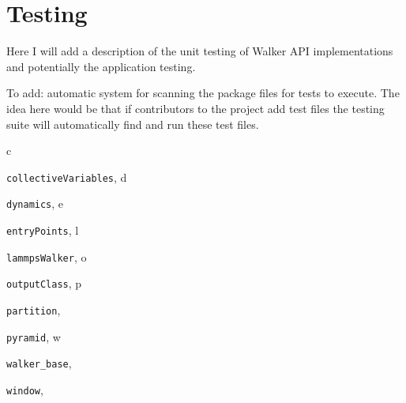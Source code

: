 \documentclass[letterpaper,10pt,english]{sphinxmanual}
\begin{document}
\chapter{Testing}
\label{test/testing.doc:testing}\label{test/testing.doc::doc}
Here I will add a description of the unit testing of Walker API implementations and potentially the application testing.

To add: automatic system for scanning the package files for tests to execute. The idea here would be that if contributors to the project add test files the testing suite will automatically find and run these test files.


\renewcommand{\indexname}{Python Module Index}
\begin{theindex}
\def\bigletter#1{{\Large\sffamily#1}\nopagebreak\vspace{1mm}}
\bigletter{c}
\item {\texttt{collectiveVariables}}, \pageref{walker_api/walker_api.doc:module-collectiveVariables}
\indexspace
\bigletter{d}
\item {\texttt{dynamics}}, \pageref{walker_api/walker_api.doc:module-dynamics}
\indexspace
\bigletter{e}
\item {\texttt{entryPoints}}, \pageref{applications/applications.doc:module-entryPoints}
\indexspace
\bigletter{l}
\item {\texttt{lammpsWalker}}, \pageref{walker_api/walker_api.doc:module-lammpsWalker}
\indexspace
\bigletter{o}
\item {\texttt{outputClass}}, \pageref{walker_api/walker_api.doc:module-outputClass}
\indexspace
\bigletter{p}
\item {\texttt{partition}}, \pageref{applications/applications.doc:module-partition}
\item {\texttt{pyramid}}, \pageref{applications/applications.doc:module-pyramid}
\indexspace
\bigletter{w}
\item {\texttt{walker\_base}}, \pageref{walker_api/walker_api.doc:module-walker_base}
\item {\texttt{window}}, \pageref{applications/applications.doc:module-window}
\end{theindex}

\renewcommand{\indexname}{Index}
\printindex
\end{document}
